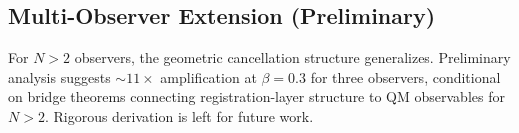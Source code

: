 \documentclass[12pt]{article}
\begin{document}
\subsection{Multi-Observer Extension (Preliminary)}

For $N > 2$ observers, the geometric cancellation structure generalizes. Preliminary analysis suggests $\sim\!11\times$ amplification at $\beta = 0.3$ for three observers, conditional on bridge theorems connecting registration-layer structure to QM observables for $N > 2$. Rigorous derivation is left for future work.
\end{document}
